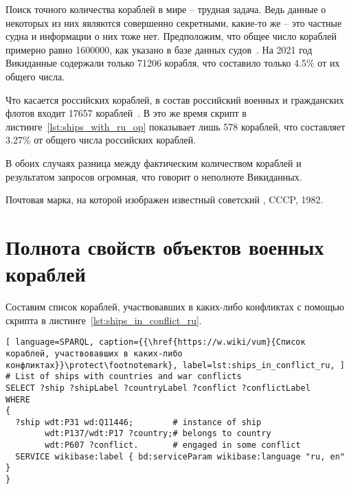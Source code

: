 \label{question:ship_1}

Поиск точного количества кораблей в мире -- трудная задача. Ведь данные о некоторых из них являются совершенно секретными, какие-то же -- это частные судна и информации о них тоже нет. Предположим, что общее число кораблей примерно равно \num{1600000}, как указано в базе данных судов~\cite{FleetMon}. На 2021 год Викиданные содержали только \num{71206} корабля, что составило только 4.5\% от их общего числа.


Что касается российских кораблей, в состав российский военных и гражданских флотов входит \num{17657} кораблей~\cite{RussianShips}. В это же время скрипт в листинге~\ref{lst:ships_with_ru_op} показывает лишь 578 кораблей, что составляет 3.27\% от общего числа российских кораблей. 

В обоих случаях разница между фактическим количеством кораблей и результатом запросов огромная, что говорит о неполноте Викиданных.

\label{question:ship_2}

\begin{marginfigure}[0.0cm]
  {
    \setlength{\fboxsep}{0pt}%
    \setlength{\fboxrule}{1pt}%
  }
  \caption[Известный советский миноносец.]{Почтовая марка, на которой изображен известный советский  , CCCP, 1982.}%
  \label{fig:grem_question}%
\end{marginfigure}

\section{Полнота свойств объектов военных кораблей}

Составим список кораблей, участвовавших в каких-либо конфликтах с помощью скрипта в листинге~\ref{lst:ships_in_conflict_ru}.

\begin{lstlisting}[ language=SPARQL, caption={{\href{https://w.wiki/vum}{Список кораблей, участвовавших в каких-либо конфликтах}}\protect\footnotemark}, label=lst:ships_in_conflict_ru, ]
# List of ships with countries and war conflicts
SELECT ?ship ?shipLabel ?countryLabel ?conflict ?conflictLabel
WHERE
{
  ?ship wdt:P31 wd:Q11446;        # instance of ship
        wdt:P137/wdt:P17 ?country;# belongs to country
        wdt:P607 ?conflict.       # engaged in some conflict
  SERVICE wikibase:label { bd:serviceParam wikibase:language "ru, en" }
}
\end{lstlisting}

